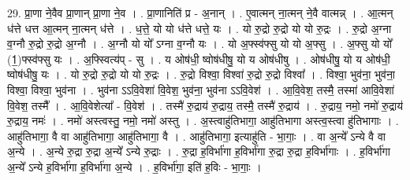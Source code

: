 \documentclass[17pt]{extarticle}
\begin{document}
29. प्रा॒णा ने॒वैव प्रा॒णान् प्रा॒णा ने॒व । . प्रा॒णानिति॑ प्र - अ॒नान् । . ए॒वात्मन् ना॒त्मन् ने॒वै वात्मन्न् । . आ॒त्मन् ध॑त्ते धत्त आ॒त्मन् ना॒त्मन् ध॑त्ते । . ध॒त्ते॒ यो यो ध॑त्ते धत्ते॒ यः । . यो रु॒द्रो रु॒द्रो यो यो रु॒द्रः । . रु॒द्रो अ॒ग्ना व॒ग्नौ रु॒द्रो रु॒द्रो अ॒ग्नौ । . अ॒ग्नौ यो यो᳚ ऽग्ना व॒ग्नौ यः । . यो अ॒फ्स्व॑फ्सु यो यो अ॒फ्सु । . अ॒फ्सु यो यो᳚ (1॒)फ्स्व॑फ्सु यः । . अ॒फ्स्वित्य॑प् - सु । . य ओष॑धी॒ ष्वोष॑धीषु॒ यो य ओष॑धीषु । . ओष॑धीषु॒ यो य ओष॑धी॒ ष्वोष॑धीषु॒ यः । . यो रु॒द्रो रु॒द्रो यो यो रु॒द्रः । . रु॒द्रो विश्वा॒ विश्वा॑ रु॒द्रो रु॒द्रो विश्वा᳚ । . विश्वा॒ भुव॑ना॒ भुव॑ना॒ विश्वा॒ विश्वा॒ भुव॑ना । . भुव॑ना ऽऽवि॒वेशा॑ वि॒वेश॒ भुव॑ना॒ भुव॑ना ऽऽवि॒वेश॑ । . आ॒वि॒वेश॒ तस्मै॒ तस्मा॑ आवि॒वेशा॑ वि॒वेश॒ तस्मै᳚ । . आ॒वि॒वेशेत्या᳚ - वि॒वेश॑ । . तस्मै॑ रु॒द्राय॑ रु॒द्राय॒ तस्मै॒ तस्मै॑ रु॒द्राय॑ । . रु॒द्राय॒ नमो॒ नमो॑ रु॒द्राय॑ रु॒द्राय॒ नमः॑ । . नमो॑ अस्त्वस्तु॒ नमो॒ नमो॑ अस्तु । . अ॒स्त्वाहु॑तिभागा॒ आहु॑तिभागा अस्त्व॒स्त्वा हु॑तिभागाः । . आहु॑तिभागा॒ वै वा आहु॑तिभागा॒ आहु॑तिभागा॒ वै । . आहु॑तिभागा॒ इत्याहु॑ति - भा॒गाः॒ । . वा अ॒न्ये᳚ ऽन्ये वै वा अ॒न्ये । . अ॒न्ये रु॒द्रा रु॒द्रा अ॒न्ये᳚ ऽन्ये रु॒द्राः । . रु॒द्रा ह॒विर्भा॑गा ह॒विर्भा॑गा रु॒द्रा रु॒द्रा ह॒विर्भा॑गाः । . ह॒विर्भा॑गा अ॒न्ये᳚ ऽन्ये ह॒विर्भा॑गा ह॒विर्भा॑गा अ॒न्ये । . ह॒विर्भा॑गा॒ इति॑ ह॒विः - भा॒गाः॒ । \newline
\end{document}
